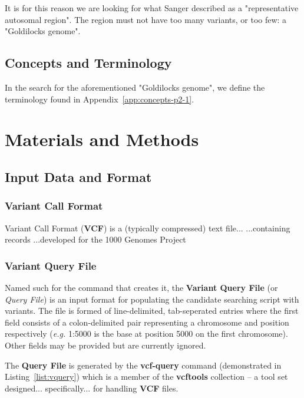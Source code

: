 It is for this reason we are looking for what Sanger described as a
"representative autosomal region". The region must not have too many
variants, or too few: a "Goldilocks genome".


\section{Concepts and Terminology}

In the search for the aforementioned "Goldilocks genome", we define the
terminology found in Appendix~\ref{app:concepts-p2-1}.



\chapter{Materials and Methods}
\section{Input Data and Format}
\label{chap:part2:input}

\subsection{Variant Call Format}

Variant Call Format (\textbf{VCF}) is a (typically compressed) text file...
...containing records
...developed for the 1000 Genomes Project

\subsection{Variant Query File}
\label{sec:vqf}

Named such for the command that creates it, the \textbf{Variant Query File} (or
\textit{Query File}) is an input format for populating the candidate searching
script with variants. The file is formed of line-delimited, tab-seperated
entries where the first field consists of a colon-delimited pair representing a
chromosome and position respectively (\textit{e.g.} 1:5000 is the base at
position 5000 on the first chromosome). Other fields may be provided but are
currently ignored.

The \textbf{Query File} is generated by the \textbf{vcf-query} command
(demonstrated in Listing~\ref{list:vquery}) which is a member of the
\textbf{vcftools} collection -- a tool set designed...  specifically... for
handling \textbf{VCF} files.

